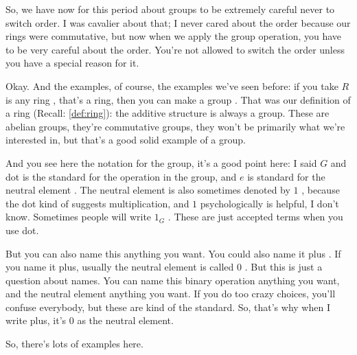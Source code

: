 \begin{speech}[00:49:46 - 00:51:49]
So, we have now for this period about groups to be extremely careful never to switch order. I was cavalier about that; I never cared about the order because our rings were commutative, but now when we apply the group operation, you have to be very careful about the order. You're not allowed to switch the order unless you have a special reason for it.

Okay. And the examples, of course, the examples we've seen before: if you take $R$ is any ring , that's a ring, then you can make a group . That was our definition of a ring (Recall: \cref{def:ring}): the additive structure is always a group. These are abelian groups, they're commutative groups, they won't be primarily what we're interested in, but that's a good solid example of a group.

And you see here the notation for the group, it's a good point here: I said $G$ and dot is the standard for the operation in the group, and $e$ is standard for the neutral element . The neutral element is also sometimes denoted by $1$ , because the dot kind of suggests multiplication, and $1$ psychologically is helpful, I don't know. Sometimes people will write $1_G$ . These are just accepted terms when you use dot.

But you can also name this anything you want. You could also name it plus . If you name it plus, usually the neutral element is called $0$ . But this is just a question about names. You can name this binary operation anything you want, and the neutral element anything you want. If you do too crazy choices, you'll confuse everybody, but these are kind of the standard. So, that's why when I write plus, it's $0$ as the neutral element.

So, there's lots of examples here.
\end{speech}


